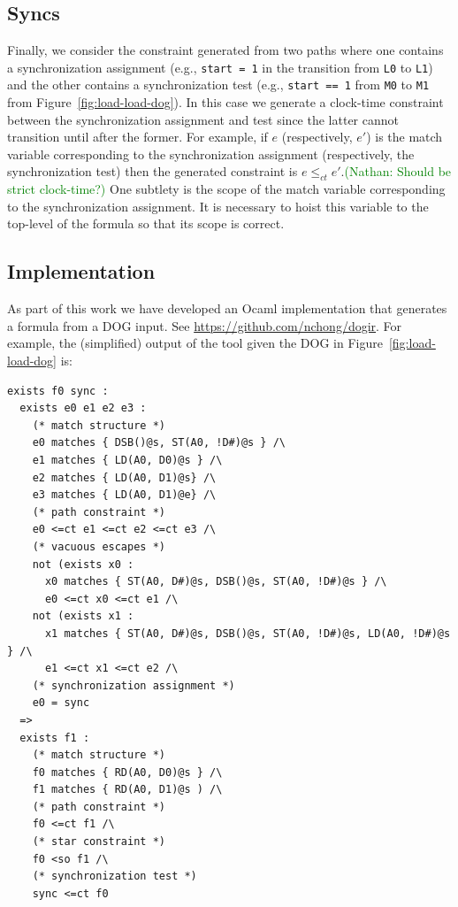 \documentclass[10pt]{paper}
\newcommand{\state}[1]{\texttt{#1}}
\newcommand{\NCComment}[1]{\textcolor{green}{(Nathan: #1)}}
\begin{document}
\subsection{Syncs}
%
Finally, we consider the constraint generated from two paths where one contains a synchronization assignment (e.g., \texttt{start = 1} in the transition from \state{L0} to \state{L1}) and the other contains a synchronization test (e.g., \texttt{start == 1} from \state{M0} to \state{M1} from Figure~\ref{fig:load-load-dog}).
%
In this case we generate a clock-time constraint between the synchronization assignment and test since the latter cannot transition until after the former.
%
For example, if $e$ (respectively, $e'$) is the match variable corresponding to the synchronization assignment (respectively, the synchronization test) then the generated constraint is $e\leq_{ct} e'$.\NCComment{Should be strict clock-time?}
%
One subtlety is the scope of the match variable corresponding to the synchronization assignment.
%
It is necessary to hoist this variable to the top-level of the formula so that its scope is correct.

\subsection{Implementation}

As part of this work we have developed an Ocaml implementation that generates a formula from a DOG input.
%
See \url{https://github.com/nchong/dogir}.
%
For example, the (simplified) output of the tool given the DOG in Figure~\ref{fig:load-load-dog} is:
%
\begin{verbatim}
exists f0 sync :
  exists e0 e1 e2 e3 :
    (* match structure *)
    e0 matches { DSB()@s, ST(A0, !D#)@s } /\
    e1 matches { LD(A0, D0)@s } /\
    e2 matches { LD(A0, D1)@s} /\ 
    e3 matches { LD(A0, D1)@e} /\
    (* path constraint *)
    e0 <=ct e1 <=ct e2 <=ct e3 /\
    (* vacuous escapes *)
    not (exists x0 :
      x0 matches { ST(A0, D#)@s, DSB()@s, ST(A0, !D#)@s } /\
      e0 <=ct x0 <=ct e1 /\
    not (exists x1 :
      x1 matches { ST(A0, D#)@s, DSB()@s, ST(A0, !D#)@s, LD(A0, !D#)@s } /\
      e1 <=ct x1 <=ct e2 /\
    (* synchronization assignment *)
    e0 = sync
  =>
  exists f1 :
    (* match structure *)
    f0 matches { RD(A0, D0)@s } /\ 
    f1 matches { RD(A0, D1)@s ) /\
    (* path constraint *)
    f0 <=ct f1 /\
    (* star constraint *)
    f0 <so f1 /\
    (* synchronization test *)
    sync <=ct f0
\end{verbatim}
\end{document}
